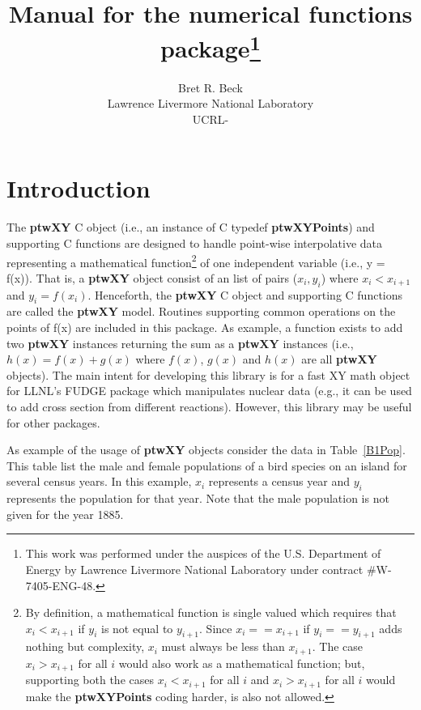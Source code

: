 \documentclass[11pt]{article}
\title{Manual for the numerical functions package\footnote{
This work was performed under the auspices of the U.S. Department of Energy by
Lawrence Livermore National Laboratory under contract \#W-7405-ENG-48.}}
\author{{Bret R. Beck}\\Lawrence Livermore National Laboratory\\UCRL-}
\newlength{\argumentNameWidth}
\newlength{\argumentNameOffset}
\newcommand{\setargumentNameLengths}[1]{
    \settowidth{\argumentNameWidth}{\tt #1: }
    \setlength{\argumentNameOffset}{\linewidth}
    \addtolength{\argumentNameOffset}{-1.\argumentNameWidth}
    \addtolength{\argumentNameOffset}{-0.05\linewidth}
}
\newcommand{\highlight}[1]{{\bf #1}}
\begin{document}
\setargumentNameLengths{interpolation}

\maketitle

\pagebreak
\tableofcontents
\listoftables
\pagebreak

\section{Introduction}
The \highlight{ptwXY} C object (i.e., an instance of C typedef \highlight{ptwXYPoints}) and supporting C functions are designed to 
handle point-wise interpolative data representing a mathematical function\footnote{By definition, a mathematical function is
single valued which requires that $x_{i} < x_{i+1}$ if $y_i$ is not equal to $y_{i+1}$. Since $x_{i} == x_{i+1}$ if $y_i == y_{i+1}$ adds nothing
but complexity, $x_{i}$ must always be less than $x_{i+1}$. The case $x_{i} > x_{i+1}$ for all $i$ would also work as
a mathematical function; but, supporting both the cases $x_{i} < x_{i+1}$ for all $i$ and $x_{i} > x_{i+1}$ for all $i$ would make the \highlight{ptwXYPoints} coding harder, 
is also not allowed.} of one independent variable (i.e., y = f(x)). That is, a \highlight{ptwXY} object consist of an 
list of pairs ($x_i,y_i$) where $x_{i} < x_{i+1}$ and $y_i = f(x_i)$. Henceforth, the \highlight{ptwXY} C object
and supporting C functions are called the \highlight{ptwXY} model. Routines supporting common operations 
on the points of f(x) are included in this package. As example, a function exists to add two \highlight{ptwXY} instances returning the sum
as a \highlight{ptwXY} instances (i.e., $h(x) = f(x) + g(x)$ where $f(x)$, $g(x)$ and $h(x)$ 
are all \highlight{ptwXY} objects). The main intent for developing this library is for a fast XY math object for LLNL's FUDGE package
which manipulates nuclear data (e.g., it can be used to add cross section from different reactions). However,
this library may be useful for other packages.

As example of the usage of \highlight{ptwXY} objects consider the data in Table~\ref{B1Pop}. 
This table list the male and female populations of a
bird species on an island for several census years. In this example, $x_i$ represents
a census year and $y_i$ represents the population for that year. Note that the male population is not
given for the year 1885. 
\end{document}
